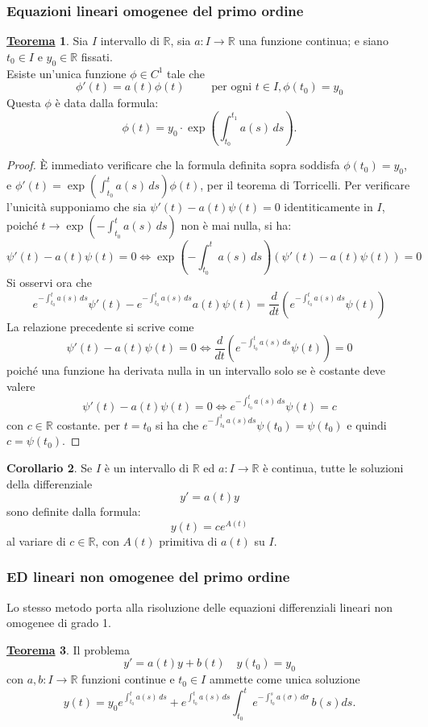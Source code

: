 \documentclass[a4paper,twoside]{article}
\newcommand{\R}{\mathbb{R}}
\theoremstyle{definition}
\newtheorem{theorem}{\color{Red}\underline{\textrm Teorema}}
\newtheorem{cor}[theorem]{Corollario}
\numberwithin{theorem}{section}
\begin{document}
\subsubsection{Equazioni lineari omogenee del primo ordine}
\begin{theorem}
    Sia $I$ intervallo di $\R$, sia $a:I \to \R$ una funzione continua; e siano $t_0\in I$ e $y_0\in\R$ fissati.\\ Esiste un'unica funzione $\phi\in C^1$ tale che 
    $$\phi'(t)=a(t)\phi(t)\qquad \text{ per ogni } t\in I,\phi(t_0)=y_0$$
    Questa $\phi$ è data dalla formula: 
    $$\phi(t) =y_0\cdot \exp\left(\int_{t_0}^{t_1}a(s)\,ds\right).$$
\end{theorem}
\begin{proof}
    È immediato verificare che la formula definita sopra soddisfa $\phi(t_0)=y_0$, e $\phi'(t)=\exp\left(\int_{t_0}^{t}a(s)\, ds\right)\phi(t)$, per il teorema di Torricelli. Per verificare l'unicità supponiamo che sia $\psi'(t)-a(t)\psi(t)=0$ identiticamente in $I$, poiché $t\to \exp\left(-\int_{t_0}^{t}a(s)\, ds\right)$ non è mai nulla, si ha:
    $$\psi'(t)-a(t)\psi(t)=0\Leftrightarrow \exp\left(-\int_{t_0}^{t}a(s)\, ds\right)(\psi'(t)-a(t)\psi(t))=0$$
    Si osservi ora che
    $$e^{-\int_{t_0}^{t}a(s)\, ds}\psi'(t)-e^{-\int_{t_0}^{t}a(s)\, ds}a(t)\psi(t)=\frac{d}{dt}\left(e^{-\int_{t_0}^{t}a(s)\, ds}\psi(t)\right)$$
    La relazione precedente si scrive come
    $$\psi'(t)-a(t)\psi(t)=0\Leftrightarrow \frac{d}{dt}\left(e^{-\int_{t_0}^{t}a(s)\, ds}\psi(t)\right)=0$$
    poiché una funzione ha derivata nulla in un intervallo solo se è costante deve valere
    $$\psi'(t)-a(t)\psi(t)=0\Leftrightarrow e^{-\int_{t_0}^{t}a(s)\, ds}\psi(t)=c$$
    con $c\in\R$ costante. per $t=t_0$ si ha che $e^{-\int_{t_0}^{t}a(s)ds}\psi(t_0)=\psi(t_0)$ e quindi $c=\psi(t_0)$.
\end{proof}
\begin{cor}
    Se $I$ è un intervallo di $\R$ ed $a:I\to\R$ è continua, tutte le soluzioni della differenziale $$y'=a(t)y$$
    sono definite dalla formula:
    $$y(t)=ce^{A(t)}$$
    al variare di $c\in\R$, con $A(t)$ primitiva di $a(t)$ su $I$.
\end{cor}


\subsubsection{ED lineari non omogenee del primo ordine}
Lo stesso metodo porta alla risoluzione delle equazioni differenziali lineari non omogenee di grado 1.
\begin{theorem}
    Il problema
    $$y'=a(t)y+b(t)\quad y(t_0)=y_0$$
    con $a,b:I\to\R$ funzioni continue e $t_0\in I$ ammette come unica soluzione
    $$y(t)=y_0e^{\int_{t_0}^{t}a(s)\, ds}+ e^{\int_{t_0}^{t}a(s)\, ds}\int_{t_0}^{t}e^{-\int_{t_0}^{s}a(\sigma)\, d\sigma}\,b(s) ds.$$ 
\end{theorem}
\end{document}
